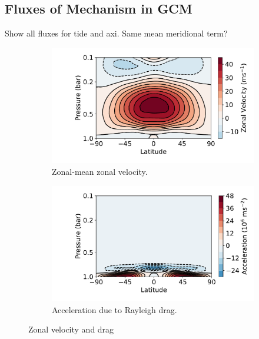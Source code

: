 \subsection{Fluxes of Mechanism in GCM}

Show all fluxes for tide and axi. Same mean meridional term?

\begin{figure}
  \centering
  \begin{subfigure}[t]{0.45\textwidth}
    \includegraphics[width=\textwidth]{figures/eqm-zonal-flow/5_flux.pdf}
    \caption{Zonal-mean zonal velocity.}
  \end{subfigure}
  \begin{subfigure}[t]{0.45\textwidth}
    \includegraphics[width=\textwidth]{figures/eqm-zonal-flow/4_flux.pdf}
    \caption{Acceleration due to Rayleigh drag.}
  \end{subfigure}
  \caption{Zonal velocity and drag}
  \label{fig:default-gcm-velocity-drag}
\end{figure}

